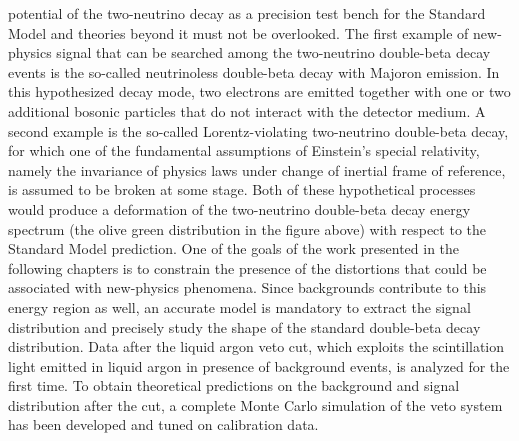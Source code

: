 potential of the two-neutrino decay as a precision test bench for the Standard Model and
theories beyond it must not be overlooked. The first example of new-physics signal that
can be searched among the two-neutrino double-beta decay events is the so-called
neutrinoless double-beta decay with Majoron emission. In this hypothesized decay mode, two
electrons are emitted together with one or two additional bosonic particles that do not
interact with the detector medium.  A second example is the so-called Lorentz-violating
two-neutrino double-beta decay, for which one of the fundamental assumptions of Einstein's
special relativity, namely the invariance of physics laws under change of inertial frame
of reference, is assumed to be broken at some stage. Both of these hypothetical processes
would produce a deformation of the two-neutrino double-beta decay energy spectrum (the
olive green distribution in the figure above) with respect to the Standard Model
prediction.  One of the goals of the work presented in the following chapters is to
constrain the presence of the distortions that could be associated with new-physics
phenomena. Since backgrounds contribute to this energy region as well, an accurate model
is mandatory to extract the signal distribution and precisely study the shape of the
standard double-beta decay distribution. Data after the liquid argon veto cut, which
exploits the scintillation light emitted in liquid argon in presence of background events,
is analyzed for the first time.  To obtain theoretical predictions on the background and
signal distribution after the cut, a complete Monte Carlo simulation of the veto system
has been developed and tuned on calibration data.

